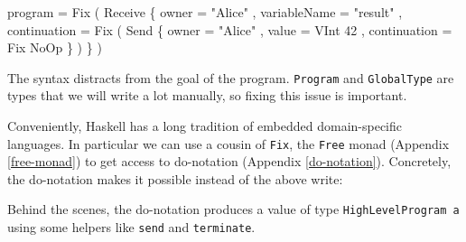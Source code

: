 \documentclass[runningheads,plain]{llncs}
\newenvironment{Shaded}{}{}
\newcommand{\KeywordTok}[1]{\textcolor[rgb]{0.00,0.44,0.13}{\textbf{#1}}}
\newcommand{\DataTypeTok}[1]{\textcolor[rgb]{0.56,0.13,0.00}{#1}}
\newcommand{\DecValTok}[1]{\textcolor[rgb]{0.25,0.63,0.44}{#1}}
\newcommand{\StringTok}[1]{\textcolor[rgb]{0.25,0.44,0.63}{#1}}
\newcommand{\OtherTok}[1]{\textcolor[rgb]{0.00,0.44,0.13}{#1}}
\newcommand{\FunctionTok}[1]{\textcolor[rgb]{0.02,0.16,0.49}{#1}}
\newcommand{\NormalTok}[1]{#1}
\begin{document}
\begin{Shaded}
\begin{Highlighting}[]
\NormalTok{program }\FunctionTok{=}  
    \DataTypeTok{Fix} 
\NormalTok{        ( }\DataTypeTok{Receive} 
\NormalTok{            \{ owner }\FunctionTok{=} \StringTok{"Alice"}
\NormalTok{            , variableName }\FunctionTok{=} \StringTok{"result"}
\NormalTok{            , continuation }\FunctionTok{=} 
                  \DataTypeTok{Fix} 
\NormalTok{                    ( }\DataTypeTok{Send} 
\NormalTok{                        \{ owner }\FunctionTok{=} \StringTok{"Alice"}
\NormalTok{                        , value }\FunctionTok{=} \DataTypeTok{VInt} \DecValTok{42}
\NormalTok{                        , continuation }\FunctionTok{=} \DataTypeTok{Fix} \DataTypeTok{NoOp} 
\NormalTok{                        \}}
\NormalTok{                    )}
\NormalTok{              \}}
\NormalTok{        )}
\end{Highlighting}
\end{Shaded}

The syntax distracts from the goal of the program. \texttt{Program} and
\texttt{GlobalType} are types that we will write a lot manually, so
fixing this issue is important.

Conveniently, Haskell has a long tradition of embedded domain-specific
languages. In particular we can use a cousin of \texttt{Fix}, the
\texttt{Free} monad (Appendix \ref{free-monad}) to get access to
do-notation (Appendix \ref{do-notation}). Concretely, the do-notation
makes it possible instead of the above write:

\begin{Shaded}
\end{Shaded}

Behind the scenes, the do-notation produces a value of type
\texttt{HighLevelProgram\ a} using some helpers like \texttt{send} and
\texttt{terminate}.
\end{document}
